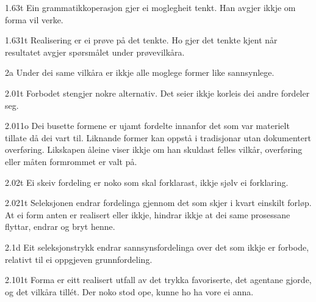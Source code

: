 \begin{formproposition}{1.63}{t}
Ein grammatikkoperasjon gjer ei moglegheit tenkt. Han avgjer ikkje om forma vil verke.
\end{formproposition}

\begin{formproposition}{1.631}{t}
Realisering er ei prøve på det tenkte. Ho gjer det tenkte kjent når resultatet avgjer spørsmålet under prøvevilkåra.
\end{formproposition}

\begin{formproposition}{2}{a}
Under dei same vilkåra er ikkje alle moglege former like sannsynlege.
\end{formproposition}

\begin{formproposition}{2.01}{t}
Forbodet stengjer nokre alternativ. Det seier ikkje korleis dei andre fordeler seg.
\end{formproposition}

\begin{formproposition}{2.011}{o}
Dei busette formene er ujamt fordelte innanfor det som var materielt tillate då dei vart til. Liknande former kan oppstå i tradisjonar utan dokumentert overføring. Likskapen åleine viser ikkje om han skuldast felles vilkår, overføring eller måten formrommet er valt på.
\end{formproposition}

\begin{formproposition}{2.02}{t}
Ei skeiv fordeling er noko som skal forklarast, ikkje sjølv ei forklaring.
\end{formproposition}

\begin{formproposition}{2.021}{t}
Seleksjonen endrar fordelinga gjennom det som skjer i kvart einskilt forløp. At ei form anten er realisert eller ikkje, hindrar ikkje at dei same prosessane flyttar, endrar og bryt henne.
\end{formproposition}

\begin{formproposition}{2.1}{d}
Eit seleksjonstrykk endrar sannsynsfordelinga over det som ikkje er forbode, relativt til ei oppgjeven grunnfordeling.
\end{formproposition}

\begin{formproposition}{2.101}{t}
Forma er eitt realisert utfall av det trykka favoriserte, det agentane gjorde, og det vilkåra tillét. Der noko stod ope, kunne ho ha vore ei anna.
\end{formproposition}

